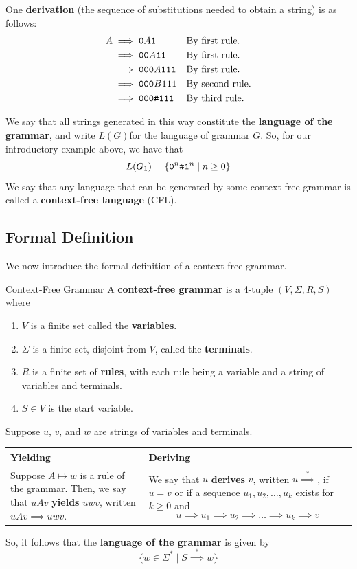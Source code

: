 \documentclass[letterpaper]{article}
\begin{document}
One \textbf{derivation} (the sequence of substitutions needed to obtain a string) is as follows:
\begin{equation*}
    \begin{aligned}
        A &\implies \texttt{0}A\texttt{1} && \text{By first rule.} \\ 
            &\implies \texttt{00}A\texttt{11} && \text{By first rule.} \\
            &\implies \texttt{000}A\texttt{111} && \text{By first rule.} \\
            &\implies \texttt{000}B\texttt{111} && \text{By second rule.} \\
            &\implies \texttt{000\#111} && \text{By third rule.} \\
    \end{aligned}
\end{equation*}

We say that all strings generated in this way constitute the \textbf{language of the grammar}, and write $L(G)$for the language of grammar $G$. So, for our introductory example above, we have that 
\[L(G_1) = \{\texttt{0}^n \texttt{\#} \texttt{1}^n \mid n \geq 0\}\]
We say that any language that can be generated by some context-free grammar is called a \textbf{context-free language} (CFL). 

\subsection{Formal Definition}
We now introduce the formal definition of a context-free grammar. 
\begin{definition}{Context-Free Grammar}{}
    A \textbf{context-free grammar} is a 4-tuple $(V, \Sigma, R, S)$ where 
    \begin{enumerate}
        \item $V$ is a finite set called the \textbf{variables}.
        \item $\Sigma$ is a finite set, disjoint from $V$, called the \textbf{terminals}.
        \item $R$ is a finite set of \textbf{rules}, with each rule being a variable and a string of variables and terminals.
        \item $S \in V$ is the start variable. 
    \end{enumerate}
\end{definition}
Suppose $u$, $v$, and $w$ are strings of variables and terminals.
\begin{center}
    \begin{tabular}{p{3in}|p{3in}}
        \textbf{Yielding} & \textbf{Deriving} \\ 
        \hline 
        Suppose $A \mapsto w$ is a rule of the grammar. Then, we say that $uAv$ \textbf{yields} $uwv$, written $uAv \implies uwv$. &
        We say that $u$ \textbf{derives} $v$, written $u \stackrel{*}{\implies}$, if $u = v$ or if a sequence $u_1, u_2, \dots, u_k$ exists for $k \geq 0$ and 
        \[u \implies u_1 \implies u_2 \implies \dots \implies u_k \implies v\]
    \end{tabular}
\end{center}
So, it follows that the \textbf{language of the grammar} is given by 
\[\{w \in \Sigma^* \mid S \stackrel{*}{\implies} w\}\]
\end{document}
